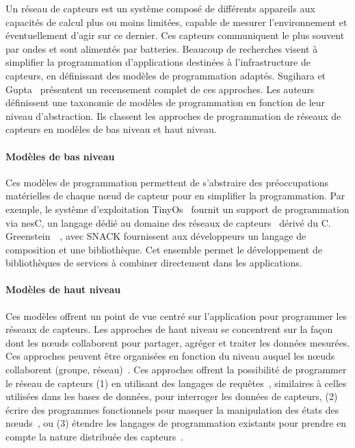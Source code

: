Un réseau de capteurs est un système composé de différents appareils aux 
capacités de calcul plus ou moins limitées, capable de mesurer l'environnement et 
éventuellement d'agir sur ce dernier. Ces capteurs communiquent le plus souvent 
par ondes et sont alimentés par batteries. Beaucoup de recherches visent à 
simplifier la programmation d'applications destinées à l'infrastructure de capteurs, en 
définissant des modèles de programmation adaptés. Sugihara et Gupta~\parencite{sugihara2008programming} 
présentent un recensement complet de ces approches. Les auteurs définissent une 
taxonomie de modèles de programmation en fonction de leur niveau d'abstraction. 
Ils classent les approches de programmation de réseaux de capteurs en modèles de 
bas niveau et haut niveau.

\paragraph{Modèles de bas niveau}
Ces modèles de programmation permettent de s'abstraire des préoccupations 
matérielles de chaque n{\oe}ud de capteur pour en simplifier la programmation. 
Par exemple, 
le système d'exploitation TinyOs~\parencite{hill2000system} fournit un support de 
programmation via nesC, un langage dédié au domaine des réseaux de 
capteurs~\parencite{gay2003the} dérivé du C. Greenstein~\etal~\parencite{greenstein2004sensor}, avec SNACK 
fournissent aux développeurs un langage de composition et une bibliothèque. Cet 
ensemble permet le développement de bibliothèques de services à combiner 
directement dans les applications.

\paragraph{Modèles de haut niveau}
Ces modèles offrent un point de vue centré sur l'application pour programmer les 
réseaux de capteurs. Les approches de haut niveau se concentrent sur la façon dont les n{\oe}uds 
collaborent pour partager, agréger et traiter les données mesurées. Ces 
approches peuvent être organisées en fonction du niveau auquel les n{\oe}uds 
collaborent (\ie groupe, réseau)~\parencite{sugihara2008programming}. 
Ces approches offrent la possibilité de programmer le réseau de capteurs (1) en 
utilisant des langages de requêtes~\parencite{madden2003design}, similaires à 
celles utilisées dans les bases de données, pour interroger les données de 
capteurs, (2) écrire des programmes fonctionnels pour masquer la manipulation 
des états des n{\oe}uds~\parencite{whitehouse2004hood}, ou (3) étendre les 
langages de programmation existants pour prendre en compte la nature distribuée 
des capteurs~\parencite{gummadi2005macro}.

